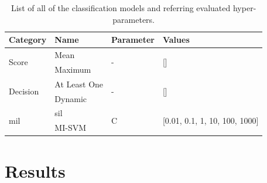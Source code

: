 \documentclass[journal,article,accept,moreauthors,pdftex, applsci]{Definitions/mdpi}
\begin{document}
\begin{table}[H]
    \centering
    \begin{tabular}{llll}
    \textbf{Category}               & \textbf{Name}     & \textbf{Parameter}& \textbf{Values}                                   \\ \hline
    \multirow{2}{*}{Score}          & Mean              & \multirow{2}{*}{-}& \multirow{2}{*}{[]}                               \\ \cline{2-2}
                                    & Maximum           &                   &                                                   \\ \hline 
    \multirow{2}{*}{Decision}       & At Least One      & \multirow{2}{*}{-}& \multirow{2}{*}{[]}                               \\ \cline{2-2}
                                    & Dynamic           &                   &                                                   \\ \hline 
    \multirow{2}{*}{\ac{mil}}       & \ac{sil}          & \multirow{2}{*}{C}& \multirow{2}{*}{[0.01, 0.1, 1, 10, 100, 1000]}    \\ \cline{2-2}
                                    & MI-SVM            &                   &                                                   \\ \hline 
    \end{tabular}    
    \caption{List of all of the classification models and referring evaluated hyper-parameters.}
    \label{tab:patient_hyperparameters}
\end{table}\par

\section{Results}
\label{sec:results}
\end{document}
